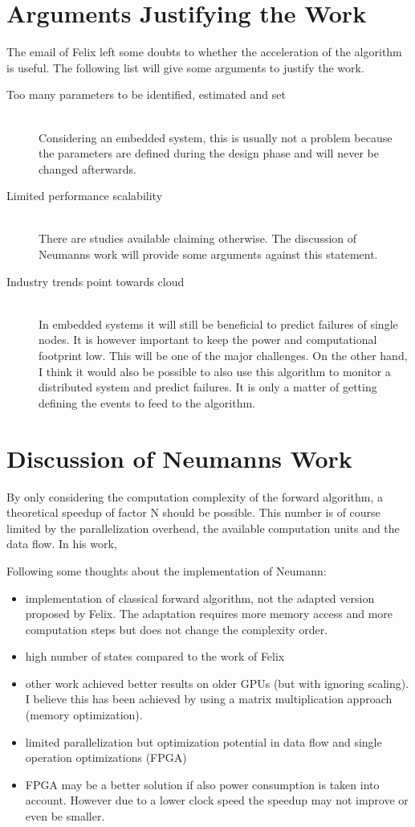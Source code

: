 \documentclass[paper=a4, fontsize=11pt]{scrartcl} %
\begin{document}
\section{Arguments Justifying the Work}
The email of Felix left some doubts to whether the acceleration of the
algorithm is useful. The following list will give some arguments to justify
the work.
\begin{description}
    \item[Too many parameters to be identified, estimated and set] \hfill \\
        Considering an embedded system, this is usually not a problem because
        the parameters are defined during the design phase and will never be
        changed afterwards.
    \item[Limited performance scalability] \hfill \\
		There are studies available claiming otherwise. The discussion of
		Neumanns work will provide some arguments against this statement.
    \item[Industry trends point towards cloud] \hfill \\
		In embedded systems it will still be beneficial to predict failures of
		single nodes. It is however important to keep the power and
		computational footprint low. This will be one of the major challenges.
		On the other hand, I think it would also be possible to also use this
		algorithm to monitor a distributed system and predict failures. It is
		only a matter of getting defining the events to feed to the algorithm.
\end{description}

\section{Discussion of Neumanns Work}
By only considering the computation complexity of the forward algorithm,
a theoretical speedup of factor N should be possible. This number is of course
limited by the parallelization overhead, the available computation units and
the data flow. In his work,

Following some thoughts about the implementation of Neumann:
\begin{itemize}
	\item implementation of classical forward algorithm, not the adapted version
		proposed by Felix. The adaptation requires more memory access and more
		computation steps but does not change the complexity order.
	\item high number of states compared to the work of Felix
	\item other work achieved better results on older GPUs (but with ignoring
		scaling). I believe this has been achieved by using a matrix
		multiplication approach (memory optimization).
	\item limited parallelization but optimization potential in data flow and
		single operation optimizations (FPGA)
	\item FPGA may be a better solution if also power consumption is taken into
		account. However due to a lower clock speed the speedup may not improve
		or even be smaller.
\end{itemize}
\end{document}
